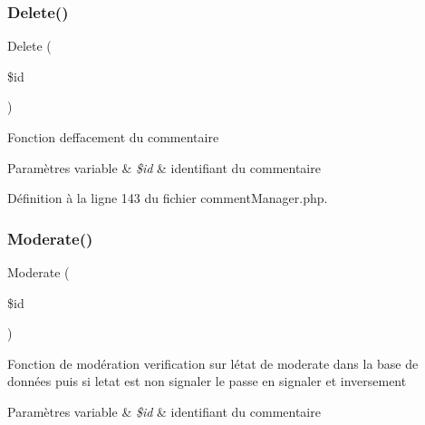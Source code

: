 \mbox{\label{class_src_1_1_managers_1_1comment_manager_a59113b5ecd1d155db6a4f30af34a1e80}} 
\subsubsection{\texorpdfstring{Delete()}{Delete()}}
{\footnotesize\ttfamily Delete (\begin{DoxyParamCaption}\item[{}]{\$id }\end{DoxyParamCaption})}

Fonction d\textquotesingle{}effacement du commentaire 
\begin{DoxyParams}[1]{Paramètres}
variable & {\em \$id} & identifiant du commentaire \\
\hline
\end{DoxyParams}


Définition à la ligne 143 du fichier comment\+Manager.\+php.

\mbox{\label{class_src_1_1_managers_1_1comment_manager_a511df177d885f133ac59c2b68c7046f2}} 
\subsubsection{\texorpdfstring{Moderate()}{Moderate()}}
{\footnotesize\ttfamily Moderate (\begin{DoxyParamCaption}\item[{}]{\$id }\end{DoxyParamCaption})}

Fonction de modération verification sur létat de \textquotesingle{}moderate\textquotesingle{} dans la base de données puis si l\textquotesingle{}etat est non signaler le passe en signaler et inversement 
\begin{DoxyParams}[1]{Paramètres}
variable & {\em \$id} & identifiant du commentaire \\
\hline
\end{DoxyParams}


